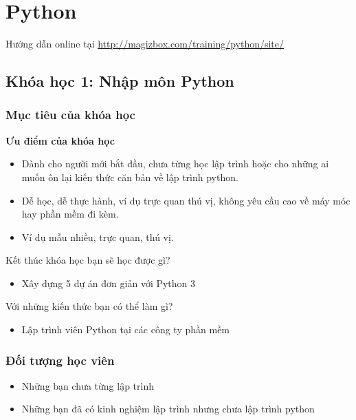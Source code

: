 \chapter{Python}


Hướng dẫn online tại \href{http://magizbox.com/training/python/site/}{http://magizbox.com/training/python/site/}

\section{Khóa học 1: Nhập môn Python}

\subsection{Mục tiêu của khóa học}

\textbf{Ưu điểm của khóa học}

\begin{itemize}
  \item Dành cho người mới bắt đầu, chưa từng học lập trình hoặc cho những ai muốn ôn lại kiến thức căn bản về lập trình python.
  \item Dễ học, dễ thực hành, ví dụ trực quan thú vị, không yêu cầu cao về máy móc hay phần mềm đi kèm.
  \item Ví dụ mẫu nhiều, trực quan, thú vị.
\end{itemize}

Kết thúc khóa học bạn sẽ học được gì?

\begin{itemize}
  \item Xây dựng 5 dự án đơn giản với Python 3
\end{itemize}

Với những kiến thức bạn có thể làm gì?

\begin{itemize}
  \item Lập trình viên Python tại các công ty phần mềm
\end{itemize}

\subsection{Đối tượng học viên}

\begin{itemize}
  \item Những bạn chưa từng lập trình
  \item Những bạn đã có kinh nghiệm lập trình nhưng chưa lập trình python
\end{itemize}

